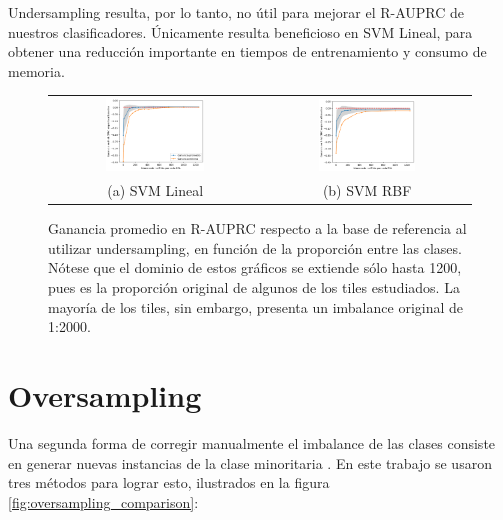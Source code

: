 Undersampling resulta, por lo tanto, no útil para mejorar el R-AUPRC de nuestros clasificadores. Únicamente resulta beneficioso en SVM Lineal, para obtener una reducción importante en tiempos de entrenamiento y consumo de memoria.

\begin{figure}[h!]
\begin{tabular}{cc}
  \includegraphics[width=0.49\textwidth]{Kap7/linearBEST.png} &   \includegraphics[width=0.49\textwidth]{Kap7/rbfBEST.png} \\
(a) SVM Lineal& (b) SVM RBF
\end{tabular}
\caption{ Ganancia promedio en R-AUPRC respecto a la base de referencia al utilizar undersampling, en función de la proporción entre las clases. Nótese que el dominio de estos gráficos se extiende sólo hasta 1200, pues es la proporción original de algunos de los tiles estudiados. La mayoría de los tiles, sin embargo, presenta un imbalance original de 1:2000. }
\label{fig:overall_undersampling}
\end{figure}

\section{Oversampling}

Una segunda forma de corregir manualmente el imbalance de las clases consiste en generar nuevas instancias de la clase minoritaria \cite{he}. En este trabajo se usaron tres métodos para lograr esto, ilustrados en la figura \ref{fig:oversampling_comparison}:

